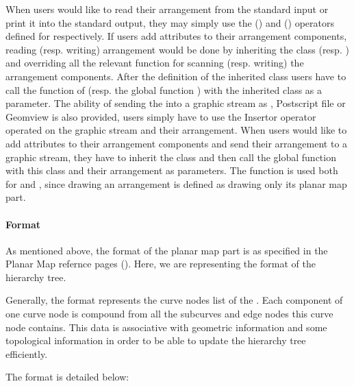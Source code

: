 \begin{ccAdvanced}
When users would like to read their arrangement from the standard input or print it into 
the standard output, they may simply use the  (\ccc{ >> }) and  (\ccc{ << }) 
operators defined for  respectively. 
If users add attributes to their arrangement components, reading (resp. writing) arrangement would 
be done by inheriting the class   (resp.  ) 
and overriding all the relevant function for scanning (resp. writing) the arrangement components. 
After the definition of the inherited class users have to call the function 
 of  (resp. the global function  ) with 
the inherited class as a parameter.
The ability of sending the  into a graphic stream as , 
Postscript file or Geomview is also provided, 
users simply have to use the Insertor operator operated on the graphic stream and their arrangement. 
When users would like to add attributes to their arrangement components 
and send their arrangement to a graphic stream, 
they have to inherit the class  and then call the global function  
with this class and their arrangement as parameters.
The function   is used both for  and , since drawing 
an arrangement is defined as drawing only its planar map part.

\paragraph{Format}
As mentioned above, the format of the planar map part is as specified 
in the Planar Map refernce pages (). 
Here, we are representing the format of the hierarchy tree.

Generally, the format represents the curve nodes list of the . 
Each component of one curve node is compound from all the subcurves and edge nodes 
this curve node contains. This data is associative with geometric information and some 
topological information in order to be able to update the hierarchy tree efficiently. 

The format is detailed below:


\end{ccAdvanced}
